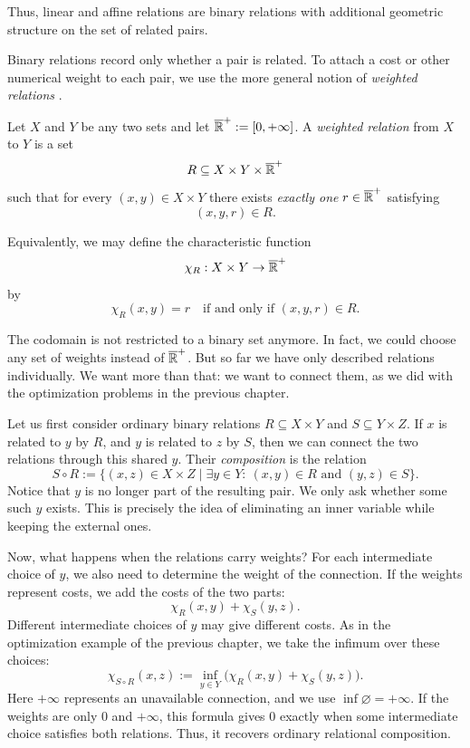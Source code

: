 Thus, linear and affine relations are binary relations with additional
geometric structure on the set of related pairs.

Binary relations record only whether a pair is related. To attach a cost or
other numerical weight to each pair, we use the more general notion of
\emph{weighted relations} \cite{lawvere1973metric}.

\begin{definition}
	Let $X$ and $Y$ be any two sets and let $\overline{\mathbb{R}}^+:= [0, +\infty]$.
	A \emph{weighted relation} from $X$ to $Y$ is a set
	\[
		R \subseteq X \times Y \times \overline{\mathbb{R}}^+
	\]
	such that for every $(x,y) \in X \times Y$ there exists \emph{exactly one}
	$r \in \overline{\mathbb{R}}^+$ satisfying
	\[
		(x,y,r) \in R.
	\]

	Equivalently, we may define the characteristic function
	\[
		\chi_R : X \times Y \to \overline{\mathbb{R}}^+
	\]
	by
	\[
		\chi_R(x,y) =
		r
		\quad \text{if and only if } (x,y,r) \in R.
	\]
\end{definition}

The codomain is not restricted to a binary set anymore. In fact, we could choose
any set of weights instead of $\overline{\mathbb{R}}^+$. But so far we have only described
relations individually. We want more than that: we want to connect them, as we
did with the optimization problems in the previous chapter.

Let us first consider ordinary binary relations $R \subseteq X\times Y$ and
$S \subseteq Y\times Z$. If $x$ is related to $y$ by $R$, and $y$ is related to
$z$ by $S$, then we can connect the two relations through this shared $y$.
Their \emph{composition} is the relation
\[
S\circ R := \{(x,z)\in X\times Z \mid
\exists y\in Y:\ (x,y)\in R \text{ and } (y,z)\in S\}.
\]
Notice that $y$ is no longer part of the resulting pair. We only ask whether
some such $y$ exists. This is precisely the idea of eliminating an inner
variable while keeping the external ones.

Now, what happens when the relations carry weights? For each intermediate
choice of $y$, we also need to determine the weight of the connection.
If the weights represent costs, we add the costs of the two parts:
\[
\chi_R(x,y)+\chi_S(y,z).
\]
Different intermediate choices of $y$ may give different costs. As in the
optimization example of the previous chapter, we take the infimum over these
choices:
\[
\chi_{S\circ R}(x,z)
:=\inf_{y\in Y}\bigl(\chi_R(x,y)+\chi_S(y,z)\bigr).
\]
Here $+\infty$ represents an unavailable connection, and we use
$\inf\varnothing=+\infty$. If the weights are only $0$ and $+\infty$,
this formula gives $0$ exactly when some intermediate choice satisfies both
relations. Thus, it recovers ordinary relational composition.

